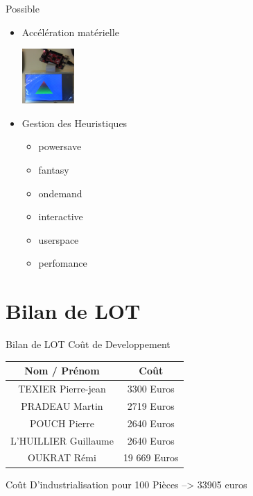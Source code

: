 \documentclass[11pt]{beamer}
\begin{document}
	\begin{frame}{Possible}
	\begin{itemize}
	 \item Accélération matérielle 
	\begin{center}
		\includegraphics[width=2cm]{common/opengles.png}
	\end{center}
	 \item Gestion des Heuristiques
	 \pause
	 \begin{itemize}
	 \item powersave
	 \pause
	 \item fantasy
	 \pause
	 \item ondemand
	 \pause
	 \item interactive
	 \pause
	 \item userspace
	 \pause
	 \item perfomance
	 \end{itemize}
	\end{itemize}
	\end{frame}

	\section{Bilan de LOT}
	\begin{frame}{Bilan de LOT}
	Coût de Developpement\\
	\begin{center}
	\begin{tabular}{|c|c|}
			\hline
			Nom / Prénom & Coût\\
			\hline
			TEXIER Pierre-jean  & 3300 Euros\\
			\hline
			PRADEAU Martin  & 2719 Euros \\
			POUCH Pierre  & 2640 Euros \\
			L'HUILLIER Guillaume  & 2640 Euros \\
			OUKRAT Rémi  & 19 669 Euros\\
				
			\hline
			\end{tabular}
			\end{center}
	Coût D'industrialisation pour 100 Pièces --> 33905 euros

	\end{frame}
	
\end{document}
